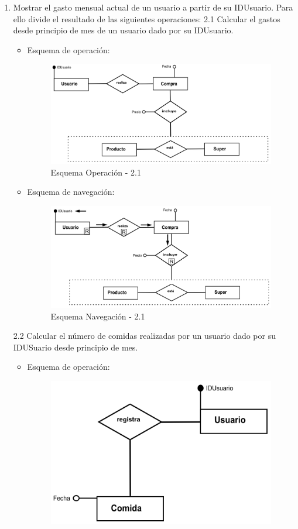 \documentclass[a4paper,12pt]{report}
\begin{document}
\begin{enumerate}
\item Mostrar el gasto mensual actual de un usuario a partir de su
IDUsuario. Para ello divide el resultado de las siguientes operaciones:
2.1 Calcular el gastos desde principio de mes de un usuario dado por su IDUsuario.
\begin{itemize}
\item Esquema de operación:
\begin{figure}[!htp]
\centering
\includegraphics[width=0.9\linewidth]{./operaciones/img/Estadisticas/21_ope.png}
\caption{Esquema Operación - 2.1}
\label{fig:ope21}
\medskip
\footnotesize
{}
\end{figure}
\item Esquema de navegación:
\begin{figure}[!htp]
\centering
\includegraphics[width=0.9\linewidth]{./operaciones/img/Estadisticas/21_nav.png}
\caption{Esquema Navegación - 2.1}
\label{fig:nave21}
\medskip
\footnotesize
{}
\end{figure}
\end{itemize}
2.2 Calcular el número de comidas realizadas por un usuario dado por su IDUSuario desde principio de mes.
\begin{itemize}
\item Esquema de operación:
\begin{figure}[!htp]
\centering
\includegraphics[width=0.7\linewidth]{./operaciones/img/Estadisticas/22_ope.png}

\end{figure}
\end{itemize}
\end{enumerate}
\end{document}

